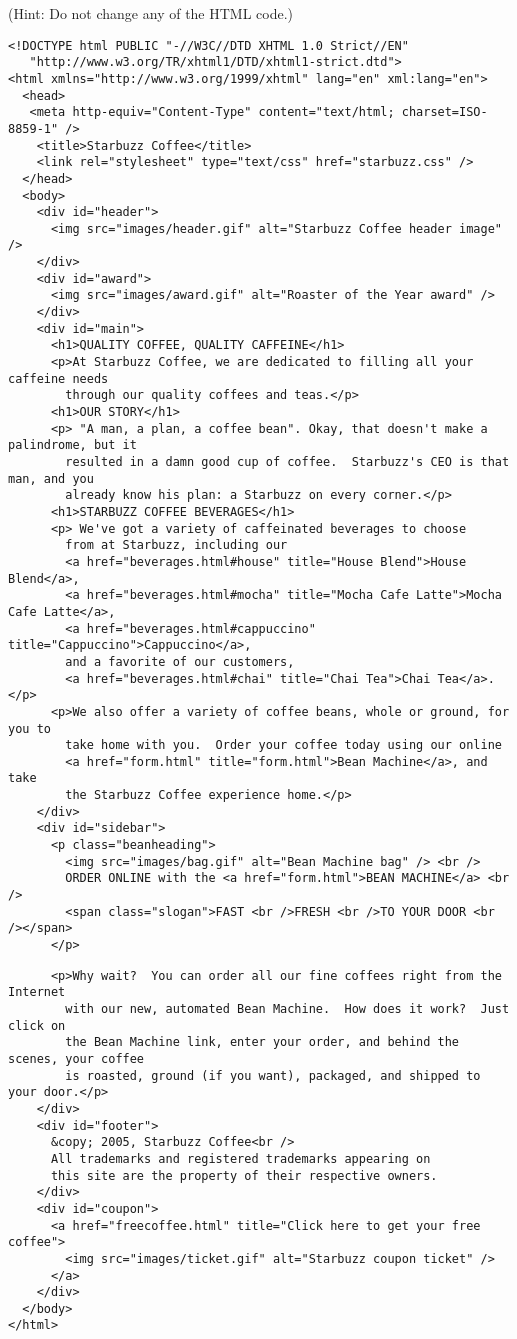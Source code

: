 {{\begin{enumerate}
     	(Hint: Do not change any of the HTML code.)

  {\footnotesize
        \begin{verbatim}
<!DOCTYPE html PUBLIC "-//W3C//DTD XHTML 1.0 Strict//EN"
   "http://www.w3.org/TR/xhtml1/DTD/xhtml1-strict.dtd">
<html xmlns="http://www.w3.org/1999/xhtml" lang="en" xml:lang="en">
  <head> 
   <meta http-equiv="Content-Type" content="text/html; charset=ISO-8859-1" />
    <title>Starbuzz Coffee</title>
    <link rel="stylesheet" type="text/css" href="starbuzz.css" />
  </head> 
  <body>
    <div id="header">
      <img src="images/header.gif" alt="Starbuzz Coffee header image" />
    </div>
    <div id="award">
      <img src="images/award.gif" alt="Roaster of the Year award" />
    </div>
    <div id="main">
      <h1>QUALITY COFFEE, QUALITY CAFFEINE</h1>
      <p>At Starbuzz Coffee, we are dedicated to filling all your  caffeine needs
        through our quality coffees and teas.</p>
      <h1>OUR STORY</h1>
      <p> "A man, a plan, a coffee bean". Okay, that doesn't make a palindrome, but it 
        resulted in a damn good cup of coffee.  Starbuzz's CEO is that man, and you 
        already know his plan: a Starbuzz on every corner.</p> 
      <h1>STARBUZZ COFFEE BEVERAGES</h1>
      <p> We've got a variety of caffeinated beverages to choose
        from at Starbuzz, including our 
        <a href="beverages.html#house" title="House Blend">House Blend</a>,
        <a href="beverages.html#mocha" title="Mocha Cafe Latte">Mocha Cafe Latte</a>, 
        <a href="beverages.html#cappuccino" title="Cappuccino">Cappuccino</a>,
        and a favorite of our customers, 
        <a href="beverages.html#chai" title="Chai Tea">Chai Tea</a>.</p>
      <p>We also offer a variety of coffee beans, whole or ground, for you to
        take home with you.  Order your coffee today using our online
        <a href="form.html" title="form.html">Bean Machine</a>, and take
        the Starbuzz Coffee experience home.</p>
    </div>
    <div id="sidebar">
      <p class="beanheading">
        <img src="images/bag.gif" alt="Bean Machine bag" /> <br />
        ORDER ONLINE with the <a href="form.html">BEAN MACHINE</a> <br />
        <span class="slogan">FAST <br />FRESH <br />TO YOUR DOOR <br /></span>
      </p>
\end{verbatim}
\newpage
\begin{verbatim}
      <p>Why wait?  You can order all our fine coffees right from the Internet 
        with our new, automated Bean Machine.  How does it work?  Just click on 
        the Bean Machine link, enter your order, and behind the scenes, your coffee 
        is roasted, ground (if you want), packaged, and shipped to your door.</p>
    </div>
    <div id="footer">
      &copy; 2005, Starbuzz Coffee<br />
      All trademarks and registered trademarks appearing on 
      this site are the property of their respective owners.
    </div>
    <div id="coupon">
      <a href="freecoffee.html" title="Click here to get your free coffee">
        <img src="images/ticket.gif" alt="Starbuzz coupon ticket" />
      </a>
    </div>
  </body>
</html>


\end{verbatim}}
\end{enumerate}}}
